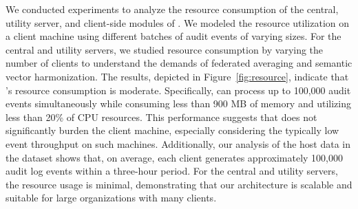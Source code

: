  We conducted experiments to analyze the resource consumption of the central, utility server, and client-side modules of \Sys. We modeled the resource utilization on a client machine using different batches of audit events of varying sizes. For the central and utility servers, we studied resource consumption by varying the number of clients to understand the demands of federated averaging and semantic vector harmonization. The results, depicted in Figure~\ref{fig:resource}, indicate that \Sys's resource consumption is moderate. Specifically, \Sys can process up to 100,000 audit events simultaneously while consuming less than 900 MB of memory and utilizing less than 20\% of CPU resources. This performance suggests that \Sys does not significantly burden the client machine, especially considering the typically low event throughput on such machines. Additionally, our analysis of the host data in the \optc dataset shows that, on average, each client generates approximately 100,000 audit log events within a three-hour period. For the central and utility servers, the resource usage is minimal, demonstrating that our architecture is scalable and suitable for large organizations with many clients.

